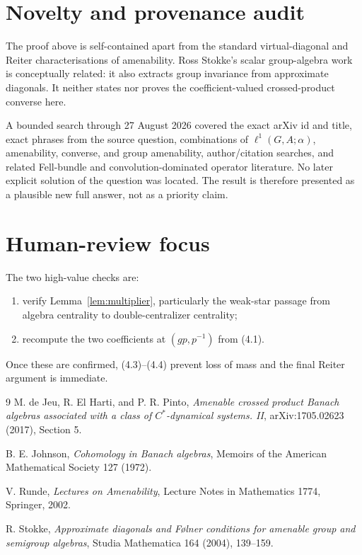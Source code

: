 \documentclass[11pt]{article}
\newcommand{\ellone}{\ell^{1}}
\begin{document}
\section{Novelty and provenance audit}

The proof above is self-contained apart from the standard virtual-diagonal
and Reiter characterisations of amenability.  Ross Stokke's scalar
group-algebra work \cite{stokke} is conceptually related: it also extracts
group invariance from approximate diagonals.  It neither states nor proves
the coefficient-valued crossed-product converse here.

A bounded search through 27 August 2026 covered the exact arXiv id and
title, exact phrases from the source question, combinations of
\(\ellone(G,A;\alpha)\), amenability, converse, and group amenability,
author/citation searches, and related Fell-bundle and convolution-dominated
operator literature.  No later explicit solution of the question was
located.  The result is therefore presented as a plausible new full answer,
not as a priority claim.

\section{Human-review focus}

The two high-value checks are:
\begin{enumerate}
\item verify Lemma~\ref{lem:multiplier}, particularly the weak-star passage
from algebra centrality to double-centralizer centrality;
\item recompute the two coefficients at \((gp,p^{-1})\) from (4.1).
\end{enumerate}
Once these are confirmed, (4.3)--(4.4) prevent loss of mass and the final
Reiter argument is immediate.

\enlargethispage{2\baselineskip}
\begingroup\small
\begin{thebibliography}{9}
M. de Jeu, R. El Harti, and P. R. Pinto,
\emph{Amenable crossed product Banach algebras associated with a class of
\(C^*\)-dynamical systems. II}, arXiv:1705.02623 (2017), Section 5.

B. E. Johnson,
\emph{Cohomology in Banach algebras},
Memoirs of the American Mathematical Society 127 (1972).

V. Runde,
\emph{Lectures on Amenability},
Lecture Notes in Mathematics 1774, Springer, 2002.

R. Stokke,
\emph{Approximate diagonals and F\o lner conditions for amenable group and
semigroup algebras}, Studia Mathematica 164 (2004), 139--159.
\end{thebibliography}
\endgroup
\end{document}
